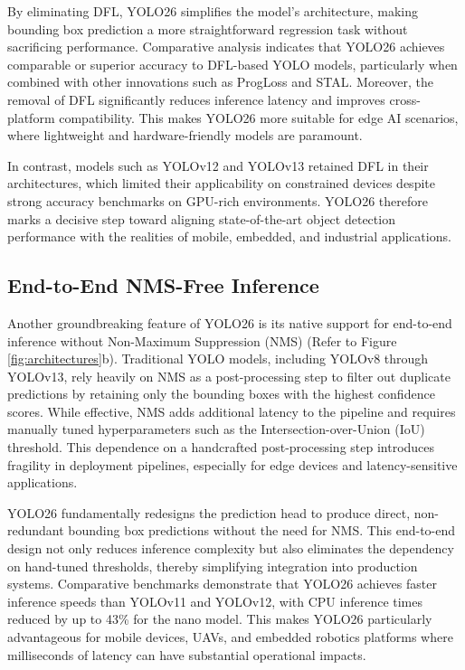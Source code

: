 \documentclass{article}
\begin{document}
By eliminating DFL, YOLO26 simplifies the model’s architecture, making bounding box prediction a more straightforward regression task without sacrificing performance. Comparative analysis indicates that YOLO26 achieves comparable or superior accuracy to DFL-based YOLO models, particularly when combined with other innovations such as ProgLoss and STAL. Moreover, the removal of DFL significantly reduces inference latency and improves cross-platform compatibility. This makes YOLO26 more suitable for edge AI scenarios, where lightweight and hardware-friendly models are paramount.  

In contrast, models such as YOLOv12 and YOLOv13 retained DFL in their architectures, which limited their applicability on constrained devices despite strong accuracy benchmarks on GPU-rich environments. YOLO26 therefore marks a decisive step toward aligning state-of-the-art object detection performance with the realities of mobile, embedded, and industrial applications.

\subsection{End-to-End NMS-Free Inference}

Another groundbreaking feature of YOLO26 is its native support for end-to-end inference without Non-Maximum Suppression (NMS) (Refer to Figure \ref{fig:architectures}b). Traditional YOLO models, including YOLOv8 through YOLOv13, rely heavily on NMS as a post-processing step to filter out duplicate predictions by retaining only the bounding boxes with the highest confidence scores. While effective, NMS adds additional latency to the pipeline and requires manually tuned hyperparameters such as the Intersection-over-Union (IoU) threshold. This dependence on a handcrafted post-processing step introduces fragility in deployment pipelines, especially for edge devices and latency-sensitive applications.  

YOLO26 fundamentally redesigns the prediction head to produce direct, non-redundant bounding box predictions without the need for NMS. This end-to-end design not only reduces inference complexity but also eliminates the dependency on hand-tuned thresholds, thereby simplifying integration into production systems. Comparative benchmarks demonstrate that YOLO26 achieves faster inference speeds than YOLOv11 and YOLOv12, with CPU inference times reduced by up to 43\% for the nano model. This makes YOLO26 particularly advantageous for mobile devices, UAVs, and embedded robotics platforms where milliseconds of latency can have substantial operational impacts.  
\end{document}
